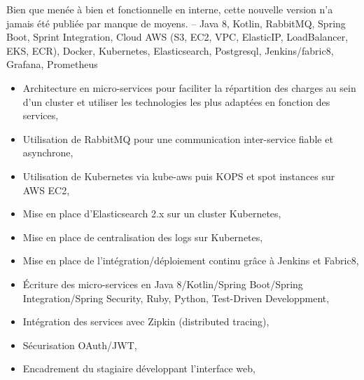 \documentclass[11pt,a4paper]{moderncv}
\begin{document}
{\begin{itemize}
{        Bien que menée à bien et fonctionnelle en interne, cette nouvelle version n'a jamais été publiée par manque de moyens.
        {\tiny -- Java 8, Kotlin, RabbitMQ, Spring Boot, Sprint Integration, Cloud AWS (S3, EC2, VPC, ElasticIP, LoadBalancer, EKS, ECR), Docker, Kubernetes, Elasticsearch, Postgresql, Jenkins/fabric8, Grafana, Prometheus}
        \begin{itemize}
        \item Architecture en micro-services pour faciliter la répartition des charges au sein d'un cluster et utiliser les technologies les plus adaptées en fonction des services,
        \item Utilisation de RabbitMQ pour une communication inter-service fiable et asynchrone,
        \item Utilisation de Kubernetes via kube-aws puis KOPS et spot instances sur AWS EC2,
        \item Mise en place d'Elasticsearch 2.x sur un cluster Kubernetes,
        \item Mise en place de centralisation des logs sur Kubernetes,
        \item Mise en place de l'intégration/déploiement continu grâce à Jenkins et Fabric8,
        \item Écriture des micro-services en Java 8/Kotlin/Spring Boot/Spring Integration/Spring Security, Ruby, Python, Test-Driven Developpment,
        \item Intégration des services avec Zipkin (distributed tracing),
        \item Sécurisation OAuth/JWT,
        \item Encadrement du stagiaire développant l'interface web,
        \end{itemize}
      }
\end{itemize}
}
\end{document}
